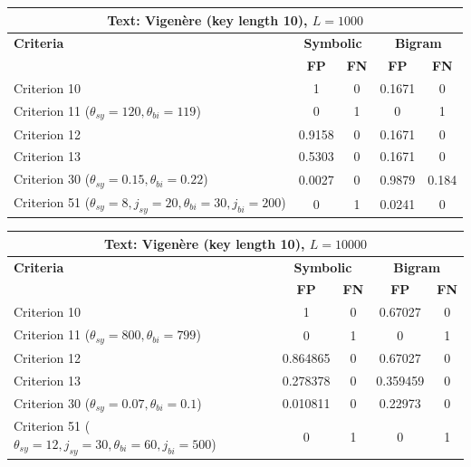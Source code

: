\begin{center}
\renewcommand{\arraystretch}{1.2}
\setlength{\tabcolsep}{6pt}
\begin{tabular}{|l||c|c||c|c|}
\hline
\multicolumn{5}{|c|}{\textbf{Text: Vigenère (key length 10), $L=1000$}} \\
\hline
\textbf{Criteria} & \multicolumn{2}{c||}{\textbf{Symbolic}} & \multicolumn{2}{c|}{\textbf{Bigram}} \\
\hline
 & \textbf{FP} & \textbf{FN} & \textbf{FP} & \textbf{FN} \\
\hline
Criterion 10 & 1 & 0 & 0.1671 & 0 \\
Criterion 11 ($\theta_{sy}=120, \theta_{bi}=119$) & 0 & 1 & 0 & 1 \\
Criterion 12 & 0.9158 & 0 & 0.1671 & 0 \\
Criterion 13 & 0.5303 & 0 & 0.1671 & 0 \\
Criterion 30 ($\theta_{sy}=0.15, \theta_{bi}=0.22$) & 0.0027 & 0 & 0.9879 & 0.184 \\
Criterion 51 ($\theta_{sy}=8, j_{sy}=20, \theta_{bi}=30, j_{bi}=200$) & 0 & 1 & 0.0241 & 0 \\
\hline
\end{tabular}
\end{center}

\begin{center}
\renewcommand{\arraystretch}{1.2}
\setlength{\tabcolsep}{6pt}
\begin{tabular}{|l||c|c||c|c|}
\hline
\multicolumn{5}{|c|}{\textbf{Text: Vigenère (key length 10), $L=10000$}} \\
\hline
\textbf{Criteria} & \multicolumn{2}{c||}{\textbf{Symbolic}} & \multicolumn{2}{c|}{\textbf{Bigram}} \\
\hline
 & \textbf{FP} & \textbf{FN} & \textbf{FP} & \textbf{FN} \\
\hline
Criterion 10 & 1 & 0 & 0.67027 & 0 \\
Criterion 11 ($\theta_{sy}=800, \theta_{bi}=799$) & 0 & 1 & 0 & 1 \\
Criterion 12 & 0.864865 & 0 & 0.67027 & 0 \\
Criterion 13 & 0.278378 & 0 & 0.359459 & 0 \\
Criterion 30 ($\theta_{sy}=0.07, \theta_{bi}=0.1$) & 0.010811 & 0 & 0.22973 & 0 \\
Criterion 51 ($\theta_{sy}=12, j_{sy}=30, \theta_{bi}=60, j_{bi}=500$) & 0 & 1 & 0 & 1 \\
\hline
\end{tabular}
\end{center}

